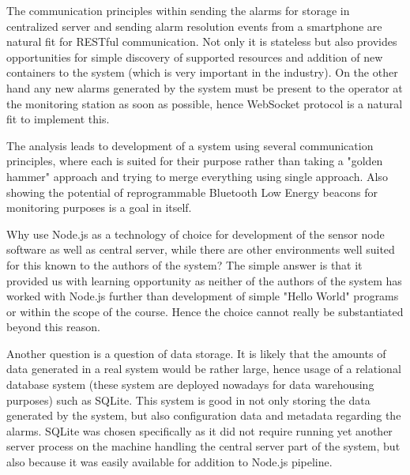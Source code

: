 \bigskip

The communication principles within sending the alarms for storage in centralized server and sending alarm resolution events from a smartphone are natural fit for RESTful communication. Not only it is stateless but also provides opportunities for simple discovery of supported resources and addition of new containers to the system (which is very important in the industry). On the other hand any new alarms generated by the system must be present to the operator at the monitoring station as soon as possible, hence WebSocket protocol is a natural fit to implement this.

\bigskip

The analysis leads to development of a system using several communication principles, where each is suited for their purpose rather than taking a "golden hammer" approach and trying to merge everything using single approach. Also showing the potential of reprogrammable Bluetooth Low Energy beacons for monitoring purposes is a goal in itself.  


\bigskip

Why use Node.js as a technology of choice for development of the sensor node software as well as central server, while there are other environments well suited for this known to the authors of the system? The simple answer is that it provided us with learning opportunity as neither of the authors of the system has worked with Node.js further than development of simple "Hello World" programs or within the scope of the course. Hence the choice cannot really be substantiated beyond this reason. 

\bigskip

Another question is a question of data storage. It is likely that the amounts of data generated in a real system would be rather large, hence usage of a relational database system (these system are deployed nowadays for data warehousing purposes) such as SQLite. This system is good in not only storing the data generated by the system, but also configuration data and metadata regarding the alarms. SQLite was chosen specifically as it did not require running yet another server process on the machine handling the central server part of the system, but also because it was easily available for addition to Node.js pipeline. 

